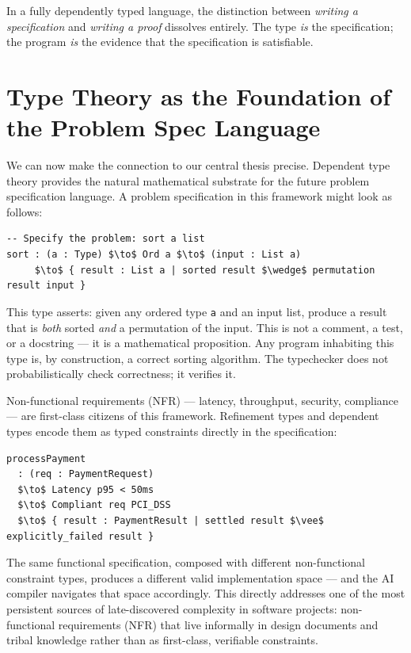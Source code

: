 \documentclass[12pt]{article}
\begin{document}
In a fully dependently typed language, the distinction between \emph{writing
a specification} and \emph{writing a proof} dissolves entirely. The type
\emph{is} the specification; the program \emph{is} the evidence that the
specification is satisfiable.

\section{Type Theory as the Foundation of the Problem Spec Language}

We can now make the connection to our central thesis precise. Dependent type
theory provides the natural mathematical substrate for the future problem
specification language. A problem specification in this framework might look
as follows:

\begin{lstlisting}[mathescape=true]
-- Specify the problem: sort a list
sort : (a : Type) $\to$ Ord a $\to$ (input : List a)
     $\to$ { result : List a | sorted result $\wedge$ permutation result input }
\end{lstlisting}

This type asserts: given any ordered type \texttt{a} and an input list,
produce a result that is \emph{both} sorted \emph{and} a permutation of the
input. This is not a comment, a test, or a docstring --- it is a mathematical
proposition. Any program inhabiting this type is, by construction, a correct
sorting algorithm. The typechecker does not probabilistically check
correctness; it verifies it.

Non-functional requirements (NFR) --- latency, throughput, security, compliance ---
are first-class citizens of this framework. Refinement types and dependent
types encode them as typed constraints directly in the specification:

\begin{lstlisting}[mathescape=true]
processPayment
  : (req : PaymentRequest)
  $\to$ Latency p95 < 50ms
  $\to$ Compliant req PCI_DSS
  $\to$ { result : PaymentResult | settled result $\vee$ explicitly_failed result }
\end{lstlisting}

The same functional specification, composed with different non-functional
constraint types, produces a different valid implementation space --- and the
AI compiler navigates that space accordingly. This directly addresses one of
the most persistent sources of late-discovered complexity in software
projects: non-functional requirements (NFR) that live informally in design documents
and tribal knowledge rather than as first-class, verifiable constraints.
\end{document}
